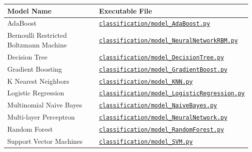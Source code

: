 \documentclass{article}
\begin{document}
\begin{table}[!htbp] \centering 
	\caption{ Model \& file containing corresponding \texttt{hyperparameter\_values} definition.}
	\label{tab:hyperparameters}
\begin{longtable}[]{@{}ll@{}}
\toprule
Model Name & Executable File \\
\midrule
\endhead
AdaBoost                               & \href{https://github.com/recursion-ninja/CSc-CSc-74020/tree/master/src/classification/model_AdaBoost.py           }{\texttt{classification/model\_AdaBoost.py}} \\
Bernoulli Restricted Boltzmann Machine & \href{https://github.com/recursion-ninja/CSc-CSc-74020/tree/master/src/classification/model_NeuralNetworkRBM.py   }{\texttt{classification/model\_NeuralNetworkRBM.py}} \\
Decision Tree                          & \href{https://github.com/recursion-ninja/CSc-CSc-74020/tree/master/src/classification/model_DecisionTree.py       }{\texttt{classification/model\_DecisionTree.py}} \\
Gradient Boosting                      & \href{https://github.com/recursion-ninja/CSc-CSc-74020/tree/master/src/classification/model_GradientBoost.py      }{\texttt{classification/model\_GradientBoost.py}} \\
K Nearest Neighbors                    & \href{https://github.com/recursion-ninja/CSc-CSc-74020/tree/master/src/classification/model_KNN.py                }{\texttt{classification/model\_KNN.py}} \\
Logistic Regression                    & \href{https://github.com/recursion-ninja/CSc-CSc-74020/tree/master/src/classification/model_LogisticRegression.py }{\texttt{classification/model\_LogisticRegression.py}} \\
Multinomial Naive Bayes                & \href{https://github.com/recursion-ninja/CSc-CSc-74020/tree/master/src/classification/model_NaiveBayes.py         }{\texttt{classification/model\_NaiveBayes.py}} \\
Multi-layer Perceptron                 & \href{https://github.com/recursion-ninja/CSc-CSc-74020/tree/master/src/classification/model_NeuralNetwork.py      }{\texttt{classification/model\_NeuralNetwork.py}} \\
Random Forest                          & \href{https://github.com/recursion-ninja/CSc-CSc-74020/tree/master/src/classification/model_RandomForest.py       }{\texttt{classification/model\_RandomForest.py}} \\
Support Vector Machines                & \href{https://github.com/recursion-ninja/CSc-CSc-74020/tree/master/src/classification/model_SVM.py                }{\texttt{classification/model\_SVM.py}} \\
\bottomrule
\end{longtable}
\end{table}
\end{document}
